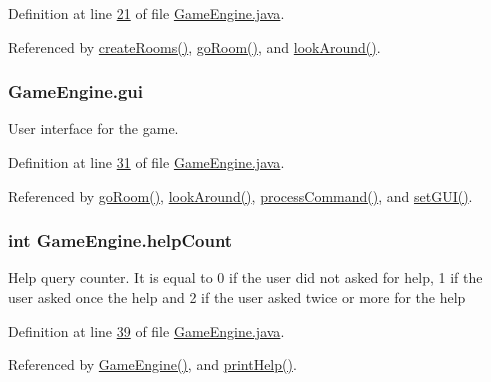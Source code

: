 Definition at line \hyperlink{GameEngine_8java_source_l00021}{21} of file \hyperlink{GameEngine_8java_source}{Game\-Engine.\-java}.



Referenced by \hyperlink{GameEngine_8java_source_l00078}{create\-Rooms()}, \hyperlink{GameEngine_8java_source_l00237}{go\-Room()}, and \hyperlink{GameEngine_8java_source_l00264}{look\-Around()}.

\hypertarget{classGameEngine_a2a7d0bb6183b3f3ef3ee2008926374a0}{
\subsubsection[{gui}]{ Game\-Engine.\-gui\hspace{0.3cm}{\ttfamily [private]}}}\label{classGameEngine_a2a7d0bb6183b3f3ef3ee2008926374a0}
User interface for the game. 

Definition at line \hyperlink{GameEngine_8java_source_l00031}{31} of file \hyperlink{GameEngine_8java_source}{Game\-Engine.\-java}.



Referenced by \hyperlink{GameEngine_8java_source_l00237}{go\-Room()}, \hyperlink{GameEngine_8java_source_l00264}{look\-Around()}, \hyperlink{GameEngine_8java_source_l00143}{process\-Command()}, and \hyperlink{GameEngine_8java_source_l00055}{set\-G\-U\-I()}.

\hypertarget{classGameEngine_a308a9926d553d53cb4c56c28588f6c62}{
\subsubsection[{help\-Count}]{\setlength{\rightskip}{0pt plus 5cm}int Game\-Engine.\-help\-Count\hspace{0.3cm}{\ttfamily [private]}}}\label{classGameEngine_a308a9926d553d53cb4c56c28588f6c62}
Help query counter. It is equal to 0 if the user did not asked for help, 1 if the user asked once the help and 2 if the user asked twice or more for the help 

Definition at line \hyperlink{GameEngine_8java_source_l00039}{39} of file \hyperlink{GameEngine_8java_source}{Game\-Engine.\-java}.



Referenced by \hyperlink{GameEngine_8java_source_l00044}{Game\-Engine()}, and \hyperlink{GameEngine_8java_source_l00174}{print\-Help()}.

